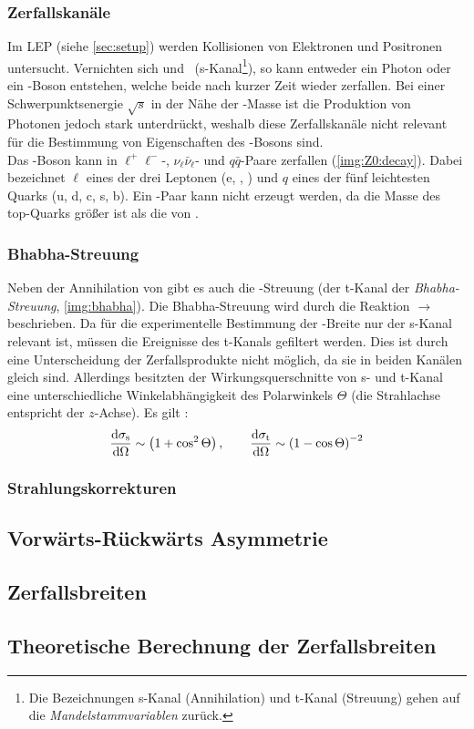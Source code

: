 \subsubsection{Zerfallskanäle}
Im LEP (siehe \autoref{sec:setup}) werden Kollisionen von Elektronen und Positronen untersucht.
Vernichten sich \elp und \elm\ (s-Kanal\footnote{Die Bezeichnungen s-Kanal (Annihilation) und t-Kanal (Streuung) gehen auf die 
\emph{Mandelstammvariablen} zurück.}), so kann entweder ein Photon oder ein \Z-Boson entstehen, welche beide nach kurzer Zeit wieder 
zerfallen. Bei einer Schwerpunktsenergie $\sqrt{s}$ in der Nähe der \Z-Masse ist die Produktion von Photonen jedoch stark unterdrückt, 
weshalb diese Zerfallskanäle nicht relevant für die Bestimmung von Eigenschaften des \Z-Bosons sind. \\
Das \Z-Boson kann in $\ell^+\ell^-$-, $\nu_\ell\bar{\nu}_\ell$- und $q\bar{q}$-Paare zerfallen (\autoref{img:Z0:decay}).
Dabei bezeichnet $\ell$ eines der drei Leptonen (e, \textmu, \texttau) und $q$ eines der fünf leichtesten Quarks (u, d, c, s, b). Ein -Paar 
kann nicht erzeugt werden, da die Masse des top-Quarks größer ist als die von \Z.
\subsubsection{Bhabha-Streuung}
Neben der Annihilation von \ee gibt es auch die \ee-Streuung (der t-Kanal der \emph{Bha\-bha-Streu\-ung}, \autoref{img:bhabha}).
Die Bhabha-Streuung wird durch die Reaktion \ee$\to$\ee beschrieben.
Da für die experimentelle Bestimmung der \Z-Breite nur der s-Kanal relevant ist, müssen die Ereignisse des t-Kanals gefiltert werden. 
Dies ist durch eine Unterscheidung der Zerfallsprodukte nicht möglich, da sie in beiden Kanälen gleich sind. Allerdings besitzten 
der Wirkungsquerschnitte von s- und t-Kanal eine unterschiedliche Winkelabhängigkeit des Polarwinkels $\Theta$ 
(die Strahlachse entspricht der $z$-Achse). Es gilt \cite{manual}:
\begin{equation}
    \label{eq:stchannel:sigmas}
    \frac{\mathrm{d} \sigma_\text{s}}{\mathrm{d} \Omega} \sim \left( 1 + \cos^2 \Theta \right), \qquad 
    \frac{\mathrm{d} \sigma_\text{t}}{\mathrm{d} \Omega} \sim \left( 1 - \cos \Theta \right)^{-2}
\end{equation}
\subsubsection{Strahlungskorrekturen}
\subsection{Vorwärts-Rückwärts Asymmetrie}
\subsection{Zerfallsbreiten}
\subsection{Theoretische Berechnung der Zerfallsbreiten}